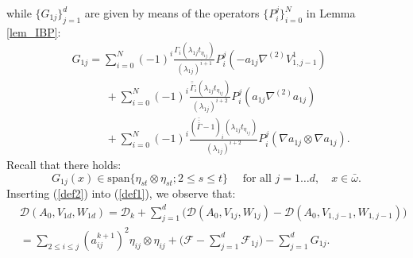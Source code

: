 \documentclass[reqno,twoside,11pt]{amsart}
\newcommand*{\dbar}[1]{\bar{\bar{#1}}}
\newcommand*{\tbar}[1]{\bar{\dbar{#1}}}
\numberwithin{equation}{section}
\theoremstyle{plain}
\theoremstyle{definition}
\begin{document}
while $\{G_{1j}\}_{j=1}^d$ are given by means of the operators
$\{P_i^j\}_{i=0}^N$ in Lemma \ref{lem_IBP}:
\begin{equation}\label{G1j}
\begin{split}
& G_{1j}= \sum_{i=0}^N (-1)^i \frac{\Gamma_{i}(\lambda_{1j}t_{\eta_{1j}})}{(\lambda_{1j})^{i+1}} 
P_i^j(-a_{1j}\nabla^{(2)}V_{1,{j-1}}^1) \\ & \qquad\quad +  \sum_{i=0}^N (-1)^i
\frac{\dbar\Gamma_{i}(\lambda_{1j}t_{\eta_{1j}})}{(\lambda_{1j})^{i+2}}  
P_i^j(a_{1j}\nabla^{(2)} a_{1j}) \\ & \qquad\quad + \sum_{i=0}^N (-1)^i
\frac{(\tbar\Gamma-1)_{i}(\lambda_{1j}t_{\eta_{1j}})}{(\lambda_{1j})^{i+2}}  
P_i^j(\nabla a_{1j}\otimes \nabla a_{1j}).
\end{split}
\end{equation}
Recall that there holds:
\begin{equation}\label{higher}
G_{1j}(x)\in\mbox{span}\{\eta_{st}\otimes \eta_{st};
2\leq s\leq t\} \quad \mbox{ for all } j=1\ldots d, \quad x\in\bar\omega.
\end{equation}
Inserting (\ref{def2}) into (\ref{def1}), we observe that:
\begin{equation}\label{def3}
\begin{split}
& \mathcal{D}(A_0, V_{1d}, W_{1d}) = \mathcal{D}_k + \sum_{j=1}^d
\Big(\mathcal{D}(A_0, V_{1j}, W_{1j}) - \mathcal{D}(A_0, V_{1,j-1}, W_{1,j-1})\Big)
\\ & = \sum_{2\leq i\leq j} (a_{ij}^{k+1})^2\eta_{ij}\otimes\eta_{ij}
+\Big(\mathcal{F} - \sum_{j=1}^d\mathcal{F}_{1j} \Big) - \sum_{j=1}^d G_{1j}. 
\end{split}
\end{equation}

\medskip
\end{document}
